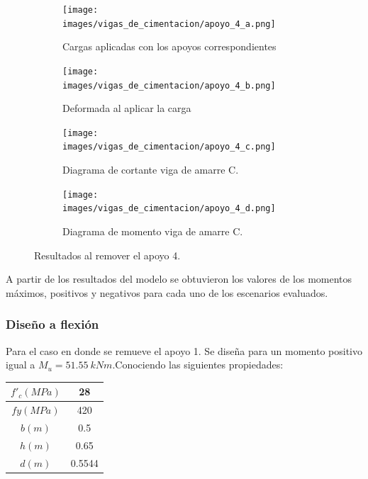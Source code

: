 \documentclass[12pt]{article}
\begin{document}
\begin{figure}[H]
\begin{subfigure}{.5\textwidth}
  \centering
  \texttt{[image: images/vigas\_de\_cimentacion/apoyo\_4\_a.png]}  
  \caption{Cargas aplicadas con los apoyos correspondientes}
  \label{fig:Cargas removiendo AP4}
\end{subfigure}
\begin{subfigure}{.5\textwidth}
  \centering
  \texttt{[image: images/vigas\_de\_cimentacion/apoyo\_4\_b.png]}  
  \caption{Deformada al aplicar la carga}
  \label{fig:Deformada AP4}
\end{subfigure}

\begin{subfigure}{.5\textwidth}
  \centering
  \texttt{[image: images/vigas\_de\_cimentacion/apoyo\_4\_c.png]}  
  \caption{Diagrama de cortante viga de amarre C.}
  \label{fig:Cortante AP4}
\end{subfigure}
\begin{subfigure}{.5\textwidth}
  \centering
  \texttt{[image: images/vigas\_de\_cimentacion/apoyo\_4\_d.png]}  
  \caption{Diagrama de momento viga de amarre C.}
  \label{fig:Momento AP4}
\end{subfigure}
\caption{Resultados al remover el apoyo 4.}
\label{fig:R apoyo 4}
\end{figure}
A partir de los resultados del modelo se obtuvieron los valores de los momentos máximos, positivos y negativos para cada uno de los escenarios evaluados.
\subsubsection{Diseño a flexión}
Para el caso en donde se remueve el apoyo 1. Se diseña para un momento positivo igual a $M_{u}=51.55~kNm$.Conociendo las siguientes propiedades:

\begin{table}[htbp]
  \centering
    \begin{tabular}{|c|c|}
    \hline
    \textbf{$f'_{c} (MPa)$} & 28 \bigstrut\\
    \hline
    \textbf{$f{y} (MPa)$} & 420 \bigstrut\\
    \hline
    $b (m)$   & 0.5 \bigstrut\\
    \hline
    $h (m)$  & 0.65 \bigstrut\\
    \hline
    $d (m)$  & 0.5544 \bigstrut\\
    \hline
    \end{tabular}%
  \label{tab:addlabel}%
\end{table}%
\end{document}
